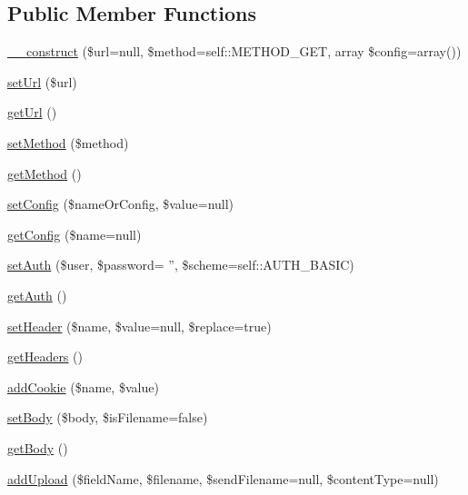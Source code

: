 \subsection*{Public Member Functions}
\begin{DoxyCompactItemize}
\item 
\hyperlink{classHTTP__Request2_a8dbfb11ace471827bd83792df59ded9f}{\-\_\-\-\_\-construct} (\$url=null, \$method=self\-::\-M\-E\-T\-H\-O\-D\-\_\-\-G\-E\-T, array \$config=array())
\item 
\hyperlink{classHTTP__Request2_a323cb019d1cb621ec9419941d42130d1}{set\-Url} (\$url)
\item 
\hyperlink{classHTTP__Request2_a35d9ef6e266d90ad52a5037b70850694}{get\-Url} ()
\item 
\hyperlink{classHTTP__Request2_a3372c369ddc092061cc15ff2f80a859f}{set\-Method} (\$method)
\item 
\hyperlink{classHTTP__Request2_a1a362b64dbeeb0321b55df04c6f2c820}{get\-Method} ()
\item 
\hyperlink{classHTTP__Request2_a57145f6158a2af444b1f7b3f38bcd0c9}{set\-Config} (\$name\-Or\-Config, \$value=null)
\item 
\hyperlink{classHTTP__Request2_a420485bbf5cc4a95399fe01138fe6ce6}{get\-Config} (\$name=null)
\item 
\hyperlink{classHTTP__Request2_a3ed0781251e632a15aadaaff960ec854}{set\-Auth} (\$user, \$password= '', \$scheme=self\-::\-A\-U\-T\-H\-\_\-\-B\-A\-S\-I\-C)
\item 
\hyperlink{classHTTP__Request2_a92573cc9573e255bd2a9fe476153898f}{get\-Auth} ()
\item 
\hyperlink{classHTTP__Request2_adbdceb126835d75826cc461c27d27b14}{set\-Header} (\$name, \$value=null, \$replace=true)
\item 
\hyperlink{classHTTP__Request2_a49ae39a8a6531b205b15496e42b994cf}{get\-Headers} ()
\item 
\hyperlink{classHTTP__Request2_aeb8d7d755804ae328a7941be4d56aff7}{add\-Cookie} (\$name, \$value)
\item 
\hyperlink{classHTTP__Request2_acff40db54d3829648859a2832f93a004}{set\-Body} (\$body, \$is\-Filename=false)
\item 
\hyperlink{classHTTP__Request2_a206f758763ed28dce4341babf5c932d0}{get\-Body} ()
\item 
\hyperlink{classHTTP__Request2_ac8e89d3a20ba389c4781f1e5adf58e04}{add\-Upload} (\$field\-Name, \$filename, \$send\-Filename=null, \$content\-Type=null)
\item 

\end{DoxyCompactItemize}
